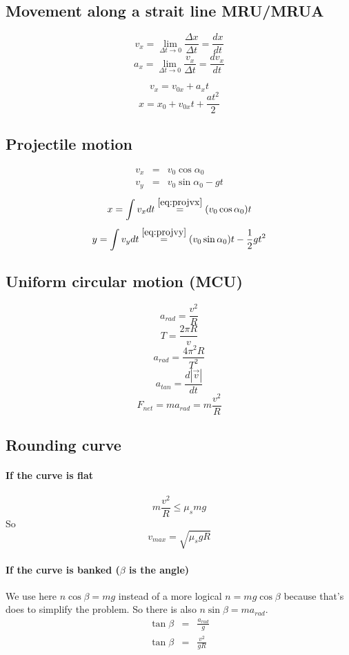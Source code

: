 \documentclass[a4paper,10pt]{article}
\begin{document}
\subsection{Movement along a strait line MRU/MRUA}
\[ v_x = \displaystyle {\lim_{\Delta t \rightarrow 0 }} \frac{\Delta x}{\Delta t} = \frac{dx}{dt} \]
\[ a_x = \displaystyle {\lim_{\Delta t \rightarrow 0 }} \frac{v_x}{\Delta t} = \frac{dv_x}{dt} \]

\[ v_x = v_{0x} + a_{x}t \]
\[ x = x_0 + v_{0x} t + \frac{a t^2}{2}\]

\subsection{Projectile motion}

\begin{eqnarray}\label{eq:projvx}
	v_x & = & v_0 \cos{ \alpha_0 }\\\label{eq:projvy}
	v_y & = & v_0 \sin{ \alpha_0 } - gt
\end{eqnarray}
\[ x = \int v_x dt \stackrel{\eqref{eq:projvx}}{=} (v_0 \cos{ \alpha_0 }) t \]
\[ y = \int v_y dt \stackrel{\eqref{eq:projvy}}{=} (v_0 \sin{ \alpha_0 }) t - \frac{1}{2} g t^2 \]

\subsection{Uniform circular motion (MCU)}
\[ a_{rad} = \frac{v^2}{R} \]
\[ T = \frac{2\pi R}{v}\]
\[ a_{rad} = \frac{4\pi^2 R}{T^2} \]
\[ a_{tan} = \frac{ d|\vec{v}| }{ dt }\]
\[ F_{net} = ma_{rad} = m\frac{v^2}{R}\]

\subsection{Rounding curve}
\paragraph{If the curve is flat}
\[ m\frac{v^2}{R} \leq \mu_smg \]
So
\[ v_{max} = \sqrt{\mu_s g R} \]
\paragraph{If the curve is banked ($ \beta $ is the angle)}
We use here $n\cos\beta = mg$ instead of a more logical $n = mg\cos\beta$ because that's \cite[p.~157]{young} does to simplify the problem. So there is also $n\sin\beta = ma_{rad}$.
\begin{eqnarray*}
\tan{\beta} & = & \frac{a_{rad}}{g}\\
\tan{\beta} & = & \frac{v^2}{gR}
\end{eqnarray*}
\end{document}
